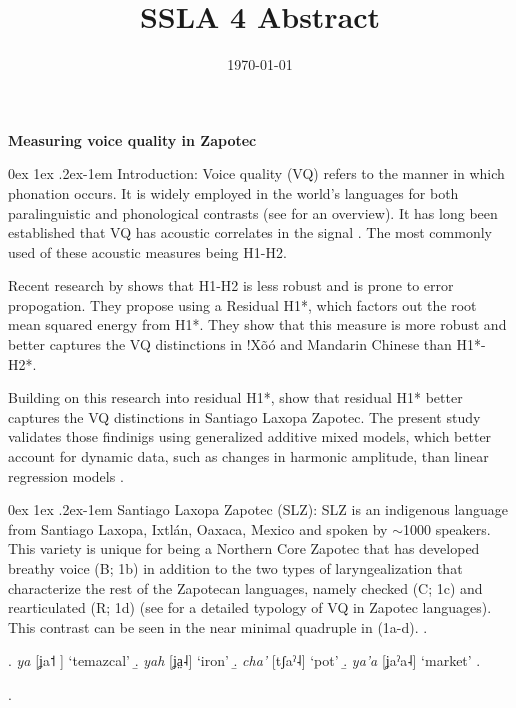 \documentclass[12pt, letterpaper]{article}
\title{SSLA 4 Abstract}
\date{\today}
\makeatletter
\renewcommand{\paragraph}{%
  \@startsection{paragraph}{4}%
  {\z@}{0ex \@plus 1ex \@minus .2ex}{-1em}%
  {\normalfont\normalsize\bfseries\itshape}%
}
\makeatother
\begin{document}


\begin{center}
    \textbf{Measuring voice quality in Zapotec}
\end{center}

\paragraph{Introduction:} Voice quality (VQ) refers to the manner in which phonation occurs. It is widely employed in the world's languages for both paralinguistic and phonological contrasts (see \cite{garellekPhoneticsVoice2019} for an overview). It has long been established that VQ has acoustic correlates in the signal \citep{fischer-jorgensenPhoneticAnalysisBreathy1968}. The most commonly used of these acoustic measures being H1-H2.

Recent research by \citet{chaiH1H2Acoustic2022} shows that H1-H2 is less robust and is prone to error propogation. They propose using a Residual H1*, which factors out the root mean squared energy from H1*. They show that this measure is more robust and better captures the VQ distinctions in !Xõó and Mandarin Chinese than H1*-H2*.

Building on this research into residual H1*, \citet{brinkerhoffResidualH1Measure2024} show that residual H1* better captures the VQ distinctions in Santiago Laxopa Zapotec. The present study validates those findinigs using generalized additive mixed models, which better account for dynamic data, such as changes in harmonic amplitude, than linear regression models \citep{hastieGeneralizedAdditiveModels1986,wielingAnalyzingDynamicPhonetic2018,soskuthyEvaluatingGeneralisedAdditive2021}. 

\paragraph{Santiago Laxopa Zapotec (SLZ):} SLZ is an indigenous language from Santiago Laxopa, Ixtlán, Oaxaca, Mexico and spoken by $\sim$1000 speakers.  This variety is unique for being a Northern Core Zapotec that has developed breathy voice (B; 1b) in addition to the two types of laryngealization that characterize the rest of the Zapotecan languages, namely checked (C; 1c) and rearticulated (R; 1d) (see \cite{ariza-garciaPhonationTypesTones2018} for a detailed typology of VQ in Zapotec languages). This contrast can be seen in the near minimal quadruple in (1a-d).
\ex.
  \begin{multicols}{2}
    \a. \textit{ya} [{\ipa ʝa˦} ] ‘temazcal’
    \b. \textit{yah} [{\ipa ʝa̤˨}] ‘iron’
    \b. \textit{cha’} [{\ipa tʃaˀ˨}] ‘pot’ 
    \b. \textit{ya’a} [{\ipa ʝaˀa˨}] ‘market’
    \z.
  \end{multicols}
\z.
\end{document}
